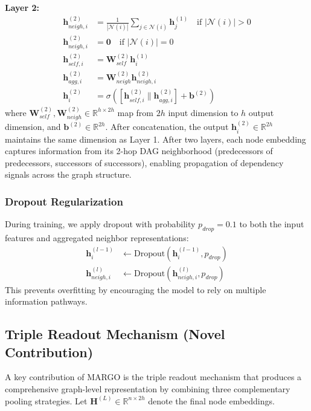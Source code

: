 \documentclass[journal,twoside]{IEEEtran}
\newcommand{\method}{\textsc{MARGO}}
\newcommand{\R}{\mathbb{R}}
\begin{document}
\textbf{Layer 2:}
    \begin{align}
\mathbf{h}_{neigh,i}^{(2)} &= \frac{1}{|\mathcal{N}(i)|} \sum_{j \in \mathcal{N}(i)} \mathbf{h}_j^{(1)} \quad \text{if } |\mathcal{N}(i)| > 0 \\
\mathbf{h}_{neigh,i}^{(2)} &= \mathbf{0} \quad \text{if } |\mathcal{N}(i)| = 0 \\
\mathbf{h}_{self,i}^{(2)} &= \mathbf{W}_{self}^{(2)} \mathbf{h}_i^{(1)} \\
\mathbf{h}_{agg,i}^{(2)} &= \mathbf{W}_{neigh}^{(2)} \mathbf{h}_{neigh,i}^{(2)} \\
\mathbf{h}_i^{(2)} &= \sigma\left( \left[ \mathbf{h}_{self,i}^{(2)} \| \mathbf{h}_{agg,i}^{(2)} \right] + \mathbf{b}^{(2)} \right)
    \end{align}
where $\mathbf{W}_{self}^{(2)}, \mathbf{W}_{neigh}^{(2)} \in \R^{h \times 2h}$ map from $2h$ input dimension to $h$ output dimension, and $\mathbf{b}^{(2)} \in \R^{2h}$. After concatenation, the output $\mathbf{h}_i^{(2)} \in \R^{2h}$ maintains the same dimension as Layer 1. After two layers, each node embedding captures information from its 2-hop DAG neighborhood (predecessors of predecessors, successors of successors), enabling propagation of dependency signals across the graph structure.

\subsubsection{Dropout Regularization}

During training, we apply dropout with probability $p_{drop} = 0.1$ to both the input features and aggregated neighbor representations:
\begin{align}
\mathbf{h}_i^{(l-1)} &\leftarrow \text{Dropout}(\mathbf{h}_i^{(l-1)}, p_{drop}) \\
\mathbf{h}_{neigh,i}^{(l)} &\leftarrow \text{Dropout}(\mathbf{h}_{neigh,i}^{(l)}, p_{drop})
\end{align}
This prevents overfitting by encouraging the model to rely on multiple information pathways.

\subsection{Triple Readout Mechanism (Novel Contribution)}

A key contribution of \method{} is the triple readout mechanism that produces a comprehensive graph-level representation by combining three complementary pooling strategies. Let $\mathbf{H}^{(L)} \in \R^{n \times 2h}$ denote the final node embeddings.
\end{document}
